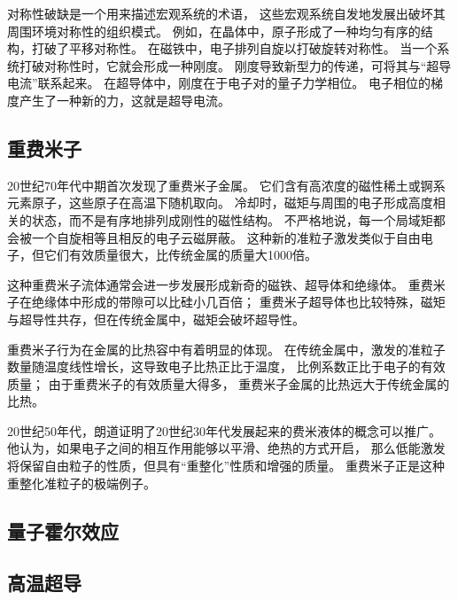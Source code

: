 \documentclass{article}
\begin{document}
对称性破缺是一个用来描述宏观系统的术语，
这些宏观系统自发地发展出破坏其周围环境对称性的组织模式。
例如，在晶体中，原子形成了一种均匀有序的结构，打破了平移对称性。
在磁铁中，电子排列自旋以打破旋转对称性。
当一个系统打破对称性时，它就会形成一种刚度。
刚度导致新型力的传递，可将其与“超导电流”联系起来。
在超导体中，刚度在于电子对的量子力学相位。
电子相位的梯度产生了一种新的力，这就是超导电流。

\subsection{重费米子}
20世纪70年代中期首次发现了重费米子金属。
它们含有高浓度的磁性稀土或锕系元素原子，这些原子在高温下随机取向。
冷却时，磁矩与周围的电子形成高度相关的状态，而不是有序地排列成刚性的磁性结构。
不严格地说，每一个局域矩都会被一个自旋相等且相反的电子云磁屏蔽。
这种新的准粒子激发类似于自由电子，但它们有效质量很大，比传统金属的质量大1000倍。 

这种重费米子流体通常会进一步发展形成新奇的磁铁、超导体和绝缘体。
重费米子在绝缘体中形成的带隙可以比硅小几百倍；
重费米子超导体也比较特殊，磁矩与超导性共存，但在传统金属中，磁矩会破坏超导性。

重费米子行为在金属的比热容中有着明显的体现。
在传统金属中，激发的准粒子数量随温度线性增长，这导致电子比热正比于温度，
比例系数正比于电子的有效质量；
由于重费米子的有效质量大得多，
重费米子金属的比热远大于传统金属的比热。

20世纪50年代，朗道证明了20世纪30年代发展起来的费米液体的概念可以推广。
他认为，如果电子之间的相互作用能够以平滑、绝热的方式开启，
那么低能激发将保留自由粒子的性质，但具有“重整化”性质和增强的质量。
重费米子正是这种重整化准粒子的极端例子。 

\subsection{量子霍尔效应}


\subsection{高温超导}
\end{document}
